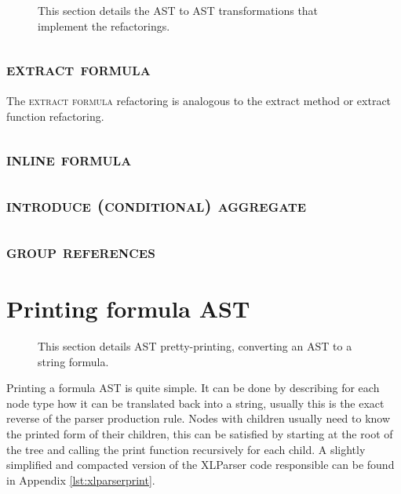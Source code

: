 \documentclass[12pt,a4paper,onecolumn,oneside,parskip]{memoir}
\newcommand{\rf}[1]{\textsc{\lowercase{#1}}}
\begin{document}
\noindent
\begin{figure}[h!]
\hspace*{0.003\textwidth}

\caption{This section details the AST to AST transformations that implement the refactorings.}
\end{figure}

\FloatBarrier

\subsection{\rf{Extract formula}}

The \rf{extract formula} refactoring is analogous to the extract method or extract function refactoring.

\subsection{\rf{Inline formula}}

\subsection{\rf{Introduce (Conditional) Aggregate}}

\subsection{\rf{Group References}}

\section{Printing formula AST}
\label{sec:printing}

\noindent
\begin{figure}[h!]
\hspace*{0.003\textwidth}

\caption{This section details AST pretty-printing, converting an AST to a string formula.}
\end{figure}

Printing a formula AST is quite simple.
It can be done by describing for each node type how it can be translated back into a string, usually this is the exact reverse of the parser production rule.
Nodes with children usually need to know the printed form of their children, this can be satisfied by starting at the root of the tree and calling the print function recursively for each child.
A slightly simplified and compacted version of the XLParser code responsible can be found in Appendix \ref{lst:xlparserprint}.
\end{document}
